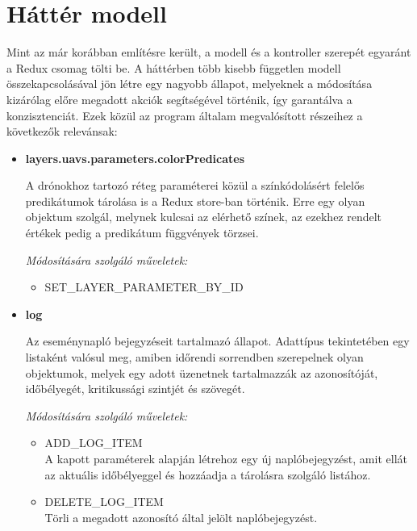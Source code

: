\section{Háttér modell}

Mint az már korábban említésre került, a modell és a kontroller szerepét
egyaránt a Redux csomag tölti be. A háttérben több kisebb független modell
összekapcsolásával jön létre egy nagyobb állapot, melyeknek a módosítása
kizárólag előre megadott akciók segítségével történik, így garantálva a
konzisztenciát. Ezek közül az program általam megvalósított részeihez a
következők relevánsak:

\begin{itemize}

  \item \textbf{layers.uavs.parameters.colorPredicates}

    A drónokhoz tartozó réteg paraméterei közül a színkódolásért felelős
    predikátumok tárolása is a Redux store-ban történik. Erre egy olyan objektum
    szolgál, melynek kulcsai az elérhető színek, az ezekhez rendelt értékek
    pedig a predikátum függvények törzsei.

    \textit{Módosítására szolgáló műveletek:}

    \begin{itemize}
      \item SET\_LAYER\_PARAMETER\_BY\_ID
    \end{itemize}

  \item \textbf{log}

    Az eseménynapló bejegyzéseit tartalmazó állapot. Adattípus tekintetében egy
    listaként valósul meg, amiben időrendi sorrendben szerepelnek olyan
    objektumok, melyek egy adott üzenetnek tartalmazzák az azonosítóját,
    időbélyegét, kritikussági szintjét és szövegét.

    \textit{Módosítására szolgáló műveletek:}

    \begin{itemize}
      \item ADD\_LOG\_ITEM \\
        A kapott paraméterek alapján létrehoz egy új naplóbejegyzést, amit ellát
        az aktuális időbélyeggel és hozzáadja a tárolásra szolgáló listához.

      \item DELETE\_LOG\_ITEM \\
        Törli a megadott azonosító által jelölt naplóbejegyzést.


\end{itemize}
\end{itemize}
